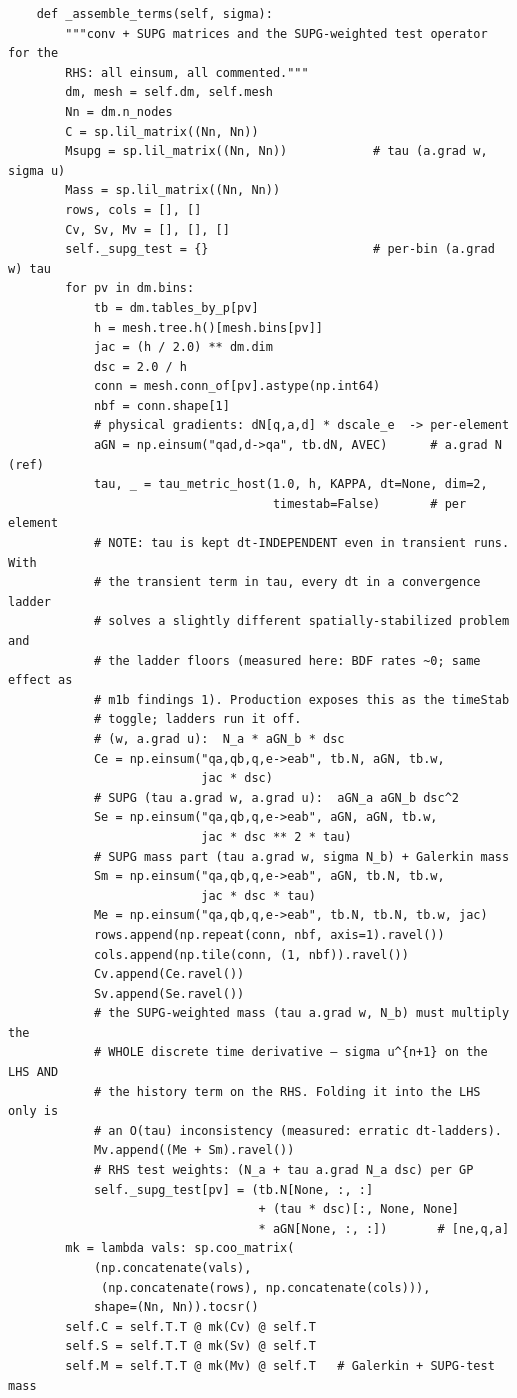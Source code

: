 \begin{lstlisting}
    def _assemble_terms(self, sigma):
        """conv + SUPG matrices and the SUPG-weighted test operator for the
        RHS: all einsum, all commented."""
        dm, mesh = self.dm, self.mesh
        Nn = dm.n_nodes
        C = sp.lil_matrix((Nn, Nn))
        Msupg = sp.lil_matrix((Nn, Nn))            # tau (a.grad w, sigma u)
        Mass = sp.lil_matrix((Nn, Nn))
        rows, cols = [], []
        Cv, Sv, Mv = [], [], []
        self._supg_test = {}                       # per-bin (a.grad w) tau
        for pv in dm.bins:
            tb = dm.tables_by_p[pv]
            h = mesh.tree.h()[mesh.bins[pv]]
            jac = (h / 2.0) ** dm.dim
            dsc = 2.0 / h
            conn = mesh.conn_of[pv].astype(np.int64)
            nbf = conn.shape[1]
            # physical gradients: dN[q,a,d] * dscale_e  -> per-element
            aGN = np.einsum("qad,d->qa", tb.dN, AVEC)      # a.grad N (ref)
            tau, _ = tau_metric_host(1.0, h, KAPPA, dt=None, dim=2,
                                     timestab=False)       # per element
            # NOTE: tau is kept dt-INDEPENDENT even in transient runs. With
            # the transient term in tau, every dt in a convergence ladder
            # solves a slightly different spatially-stabilized problem and
            # the ladder floors (measured here: BDF rates ~0; same effect as
            # m1b findings 1). Production exposes this as the timeStab
            # toggle; ladders run it off.
            # (w, a.grad u):  N_a * aGN_b * dsc
            Ce = np.einsum("qa,qb,q,e->eab", tb.N, aGN, tb.w,
                           jac * dsc)
            # SUPG (tau a.grad w, a.grad u):  aGN_a aGN_b dsc^2
            Se = np.einsum("qa,qb,q,e->eab", aGN, aGN, tb.w,
                           jac * dsc ** 2 * tau)
            # SUPG mass part (tau a.grad w, sigma N_b) + Galerkin mass
            Sm = np.einsum("qa,qb,q,e->eab", aGN, tb.N, tb.w,
                           jac * dsc * tau)
            Me = np.einsum("qa,qb,q,e->eab", tb.N, tb.N, tb.w, jac)
            rows.append(np.repeat(conn, nbf, axis=1).ravel())
            cols.append(np.tile(conn, (1, nbf)).ravel())
            Cv.append(Ce.ravel())
            Sv.append(Se.ravel())
            # the SUPG-weighted mass (tau a.grad w, N_b) must multiply the
            # WHOLE discrete time derivative — sigma u^{n+1} on the LHS AND
            # the history term on the RHS. Folding it into the LHS only is
            # an O(tau) inconsistency (measured: erratic dt-ladders).
            Mv.append((Me + Sm).ravel())
            # RHS test weights: (N_a + tau a.grad N_a dsc) per GP
            self._supg_test[pv] = (tb.N[None, :, :]
                                   + (tau * dsc)[:, None, None]
                                   * aGN[None, :, :])       # [ne,q,a]
        mk = lambda vals: sp.coo_matrix(
            (np.concatenate(vals),
             (np.concatenate(rows), np.concatenate(cols))),
            shape=(Nn, Nn)).tocsr()
        self.C = self.T.T @ mk(Cv) @ self.T
        self.S = self.T.T @ mk(Sv) @ self.T
        self.M = self.T.T @ mk(Mv) @ self.T   # Galerkin + SUPG-test mass


\end{lstlisting}
